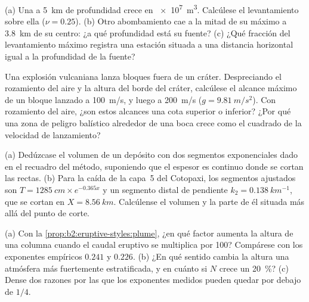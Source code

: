 \begin{exercise}[$\star\star$]\label{exo:b2:eruptive-styles:8}
(a) Una  a \qty{5}{km} de profundidad crece en \qty{e7}{m^3}. Calcúlese el
levantamiento sobre ella ($\nu = 0.25$). (b) Otro abombamiento cae a la mitad de su máximo
a \qty{3.8}{km} de su centro: ¿a qué profundidad está su fuente? (c) ¿Qué fracción del
levantamiento máximo registra una estación situada a una distancia horizontal igual a la profundidad de la
fuente?
\end{exercise}

\begin{exercise}[$\star\star$]\label{exo:b2:eruptive-styles:9}
Una explosión vulcaniana lanza bloques fuera de un cráter. Despreciando el rozamiento del aire
y la altura del borde del cráter, calcúlese el alcance máximo de un bloque lanzado
a \qty{100}{m/s}, y luego a \qty{200}{m/s} ($g = \qty{9.81}{m/s^2}$). Con rozamiento del
aire, ¿son estos alcances una cota superior o inferior? ¿Por qué una zona de
peligro balístico alrededor de una boca crece como el cuadrado de la velocidad de lanzamiento?
\end{exercise}

\begin{exercise}[$\star\star\star$]\label{exo:b2:eruptive-styles:10}
(a) Dedúzcase el volumen de un depósito con dos segmentos exponenciales dado en el
recuadro del método, suponiendo que el espesor es continuo donde se cortan las rectas. (b) Para
la caída de la capa~5 del Cotopaxi, los segmentos ajustados son $T = \qty{1285}{cm}\times
e^{-0.365x}$ y un segmento distal de pendiente $k_2 = \qty{0.138}{km^{-1}}$, que se cortan en
$X = \qty{8.56}{km}$. Calcúlense el volumen y la parte de él situada más allá del punto
de corte.
\end{exercise}

\begin{exercise}[$\star\star\star$]\label{exo:b2:eruptive-styles:11}
(a) Con la \cref{prop:b2:eruptive-styles:plume}, ¿en qué factor aumenta la altura de una
columna cuando el caudal eruptivo se multiplica por 100? Compárese con los
exponentes empíricos $0.241$ y $0.226$. (b) ¿En qué sentido cambia la altura una atmósfera
más fuertemente estratificada, y en cuánto si $N$ crece un
\qty{20}{\percent}? (c) Dense dos razones por las que los exponentes medidos pueden quedar por debajo de
$1/4$.
\end{exercise}

